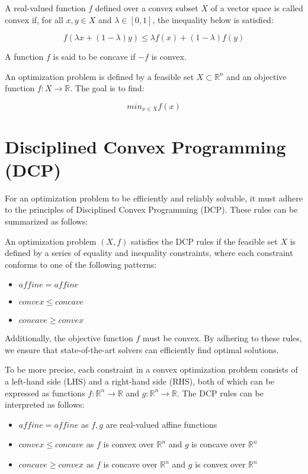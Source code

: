 A real-valued function $f$ defined over a convex subset $X$ of a vector space is called convex if, for all $x,y\in X$ and $\lambda\in [0,1]$, the inequality below is satisfied:

\begin{equation}
	f(\lambda x + (1-\lambda) y) \leq \lambda f(x) + (1-\lambda) f(y)
	\label{eq:convex_function_criteria}
\end{equation}

A function $f$ is said to be concave if $-f$ is convex.

An optimization problem is defined by a feasible set $X\subset \mathbb{R}^n$ and an objective function $f:X\to \mathbb{R}$.
The goal is to find:

\[ min_{x\in X}f(x) \]

\section{Disciplined Convex Programming (DCP)}

For an optimization problem to be efficiently and reliably solvable, it must adhere to the principles of Disciplined Convex
Programming (DCP).
These rules can be summarized as follows:

An optimization problem $(X,f)$ satisfies the DCP rules if the feasible set $X$ is defined by a series of equality and inequality constraints, where each constraint conforms to one of the following patterns:
\begin{itemize}
	\item $affine = affine$
	\item $convex\leq concave$
	\item $concave\geq convex$
\end{itemize}
Additionally, the objective function $f$ must be convex.
By adhering to these rules, we ensure that state-of-the-art solvers can efficiently find optimal solutions.

To be more precise, each constraint in a convex optimization problem consists of a left-hand side (LHS) and a right-hand side (RHS), both of which
can be expressed as functions $f:\mathbb{R}^n\to \mathbb{R}$ and $g:\mathbb{R}^n\to \mathbb{R}$.
The DCP rules can be interpreted as follows:
\begin{itemize}
	\item $affine = affine$ as $f, g$ are real-valued affine functions
	\item $convex\leq concave$ as $f$ is convex over $\mathbb{R}^n$ and $g$ is concave over $\mathbb{R}^n$
	\item $concave\geq convex$ as $f$ is concave over $\mathbb{R}^n$ and $g$ is convex over $\mathbb{R}^n$
\end{itemize}

